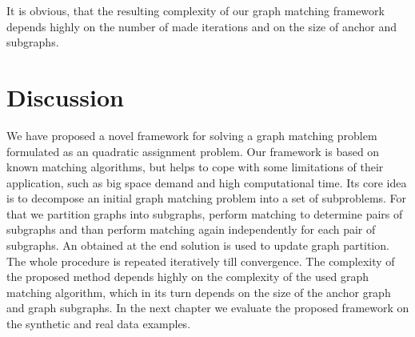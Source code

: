 It is obvious, that the resulting complexity of our graph matching framework depends highly on the number of made iterations and on the size of anchor and subgraphs.


\section{Discussion}
We have proposed a novel framework for solving a graph matching problem formulated as an quadratic assignment problem. Our framework is based on known matching algorithms, but helps to cope with some limitations of their application, such as big space demand and high computational time.
Its core idea is to decompose an initial graph matching problem into a set of subproblems. For that we partition graphs into subgraphs, perform matching to determine pairs of subgraphs and than perform matching again independently for each pair of subgraphs. An obtained at the end solution is used to update graph partition. The whole procedure is repeated iteratively till convergence. The complexity of the proposed method depends highly on the complexity of the used graph matching algorithm, which in its turn depends on the size of the anchor graph and graph subgraphs. In the next chapter we evaluate the proposed framework on the synthetic and real data examples.
